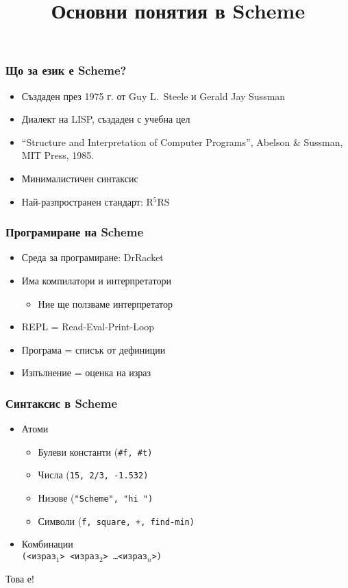 \documentclass{beamer}
\title{Основни понятия в Scheme}
\begin{document}
\begin{frame}
  \titlepage
\end{frame}

\begin{frame}
  \frametitle{Що за език е Scheme?}

  \begin{itemize}
  \item Създаден през 1975 г. от Guy L.~Steele и  Gerald Jay Sussman
  \item Диалект на LISP, създаден с учебна цел
  \item ``Structure and Interpretation of Computer Programs'', Abelson \& Sussman, MIT Press, 1985.
  \item Минималистичен синтаксис
  \item Най-разпространен стандарт: R$^5$RS
  \end{itemize}
\end{frame}

\begin{frame}
  \frametitle{Програмиране на Scheme}

  \begin{itemize}
  \item Среда за програмиране: DrRacket
  \item Има компилатори и интерпретатори
    \begin{itemize}
    \item Ние ще ползваме интерпретатор
    \end{itemize}
  \item REPL = Read-Eval-Print-Loop
  \item Програма = списък от дефиниции
  \item Изпълнение = оценка на израз
  \end{itemize}
\end{frame}

\begin{frame}
  \frametitle{Синтаксис в Scheme}

  \begin{itemize}
  \item Атоми
    \begin{itemize}
    \item Булеви константи (\tt{\#f}, \tt{\#t})
    \item Числа (\tt{15}, \tt{2/3}, \tt{-1.532})
    \item Низове (\tt{"Scheme"}, \tt{"hi "})
    \item Символи (\tt f, \tt{square}, \tt +, \tt{find-min})
    \end{itemize}
  \item Комбинации\\
    \vspace{1em}
    \tt{\alert({}<израз$_1$> <израз$_2$> \ldots <израз$_n$>\alert)}
  \end{itemize}

  \pause
  Това е!
\end{frame}
\end{document}
